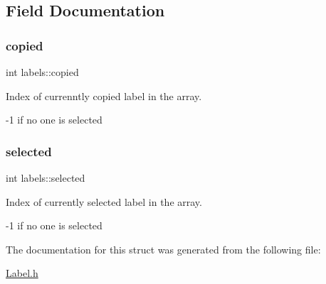 \subsection{Field Documentation}
\mbox{\label{structlabels_ab616dbd228089b53455d264a9962ffbb}} 
\subsubsection{\texorpdfstring{copied}{copied}}
{\footnotesize\ttfamily int labels\+::copied}



Index of currenntly copied label in the array. 

-\/1 if no one is selected \mbox{\label{structlabels_add7d8df7e0814e1e1c5aec4b626b8065}} 
\subsubsection{\texorpdfstring{selected}{selected}}
{\footnotesize\ttfamily int labels\+::selected}



Index of currently selected label in the array. 

-\/1 if no one is selected 

The documentation for this struct was generated from the following file\+:\begin{DoxyCompactItemize}
\item 
\hyperlink{Label_8h}{Label.\+h}\end{DoxyCompactItemize}
